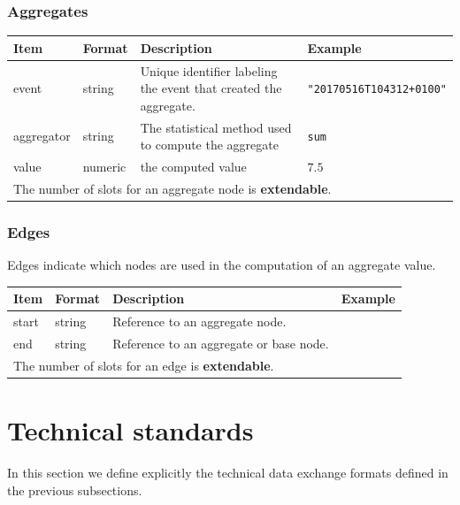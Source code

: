 \documentclass[a4paper, 11pt,titlepage]{article}
\newcommand{\code}[1]{\texttt{#1}}
\begin{document}
\subsubsection{Aggregates}
\label{sect:aggregates}
\begin{center}
\begin{tabular}{|lp{}p{}p{}|}
\hline
\textbf{Item} & \textbf{Format} & \textbf{Description} &\textbf{Example}\\
\hline
event        & string & Unique identifier labeling the event 
               that created the aggregate. & \code{"20170516T104312+0100"}\\
aggregator   & string & The statistical method used to compute the aggregate & \code{sum}\\
value        & numeric& the computed value & $7.5$\\
\hline
\multicolumn{4}{|l|}{The number of slots for an aggregate node is \textbf{extendable}.
}\\
\hline
\end{tabular}
\end{center}


\subsubsection{Edges}
Edges indicate which nodes are used in the computation of an aggregate value.
\begin{center}
\begin{tabular}{|lp{}p{}p{}|}
\hline
\textbf{Item} & \textbf{Format} & \textbf{Description} &\textbf{Example}\\
\hline
start  & string & Reference to an aggregate node. & \\
end    & string & Reference to an aggregate or base node. & \\
\hline
\multicolumn{4}{|l|}{The number of slots for an edge is \textbf{extendable}.
}\\
\hline
\end{tabular}
\end{center}




\clearpage{}
\section{Technical standards}
In this section we define explicitly the technical data exchange
formats defined in the previous subsections.
\end{document}
